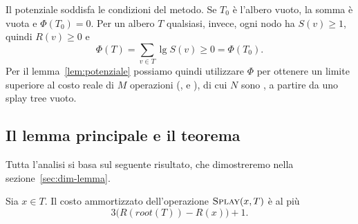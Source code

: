 Il potenziale soddisfa le condizioni del metodo. Se $T_0$ è l'albero vuoto, la somma è vuota e $\Phi(T_0) = 0$. Per un albero $T$ qualsiasi, invece, ogni nodo ha $S(v) \ge 1$, quindi $R(v) \ge 0$ e
\[
\Phi(T) = \sum_{v \in T} \lg S(v) \ge 0 = \Phi(T_0).
\]
Per il lemma~\ref{lem:potenziale} possiamo quindi utilizzare $\Phi$ per ottenere un limite superiore al costo reale di $M$ operazioni (\Search, \Insert{} e \Delete), di cui $N$ sono \Insert, a partire da uno splay tree vuoto.

\subsection{Il lemma principale e il teorema}
Tutta l'analisi si basa sul seguente risultato, che dimostreremo nella sezione~\ref{sec:dim-lemma}.

\begin{lemma}\label{lem:splay}
Sia $x \in T$. Il costo ammortizzato dell'operazione $\textsc{Splay}(x,T)$ è al più
\[
3\big(R(\mathit{root}(T)) - R(x)\big) + 1.
\]
\end{lemma}

